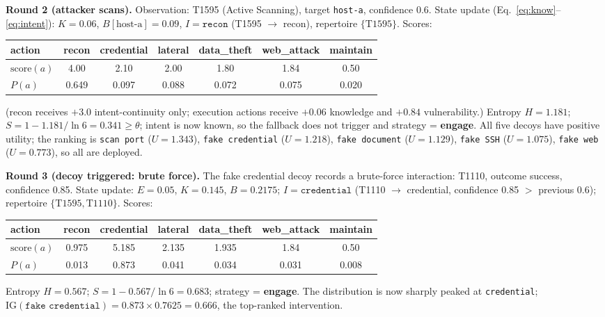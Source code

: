 \documentclass[11pt]{article}
\newcommand{\act}[1]{\texttt{#1}}
\begin{document}
\textbf{Round 2 (attacker scans).} Observation: T1595 (Active Scanning),
target \act{host-a}, confidence 0.6. State update
(Eq.~\ref{eq:know}--\ref{eq:intent}): $K = 0.06$, $B[\text{host-a}] = 0.09$,
$I = \act{recon}$ (T1595 $\to$ recon), repertoire $\{\text{T1595}\}$.
Scores:
\begin{center}
\begin{adjustbox}{max width=\linewidth}\begin{tabular}{lcccccc}
\toprule
action & recon & credential & lateral & data\_theft & web\_attack & maintain \\
\midrule
$\mathrm{score}(a)$ & 4.00 & 2.10 & 2.00 & 1.80 & 1.84 & 0.50 \\
$P(a)$ & 0.649 & 0.097 & 0.088 & 0.072 & 0.075 & 0.020 \\
\bottomrule
\end{tabular}\end{adjustbox}
\end{center}
(recon receives $+3.0$ intent-continuity only; execution
actions receive $+0.06$ knowledge and $+0.84$ vulnerability.) Entropy
$H = 1.181$; $S = 1 - 1.181/\ln 6 = 0.341 \geq \theta$; intent is now
known, so the fallback does not trigger and strategy =
\textbf{engage}. All five decoys have positive utility; the ranking is
\act{scan port} ($U=1.343$), \act{fake credential} ($U=1.218$), \act{fake
document} ($U=1.129$), \act{fake SSH} ($U=1.075$), \act{fake web}
($U=0.773$), so all are deployed.

\textbf{Round 3 (decoy triggered: brute force).} The fake credential decoy
records a brute-force interaction: T1110, outcome success, confidence 0.85.
State update: $E = 0.05$, $K = 0.145$, $B = 0.2175$; $I = \act{credential}$
(T1110 $\to$ credential, confidence 0.85 $>$ previous 0.6); repertoire
$\{\text{T1595}, \text{T1110}\}$. Scores:
\begin{center}
\begin{adjustbox}{max width=\linewidth}\begin{tabular}{lcccccc}
\toprule
action & recon & credential & lateral & data\_theft & web\_attack & maintain \\
\midrule
$\mathrm{score}(a)$ & 0.975 & 5.185 & 2.135 & 1.935 & 1.84 & 0.50 \\
$P(a)$ & 0.013 & 0.873 & 0.041 & 0.034 & 0.031 & 0.008 \\
\bottomrule
\end{tabular}\end{adjustbox}
\end{center}
Entropy $H = 0.567$; $S = 1 - 0.567/\ln 6 = 0.683$; strategy =
\textbf{engage}. The distribution is now sharply peaked at
\act{credential}; $\mathrm{IG}(\act{fake credential}) = 0.873 \times
0.7625 = 0.666$, the top-ranked intervention.
\end{document}
